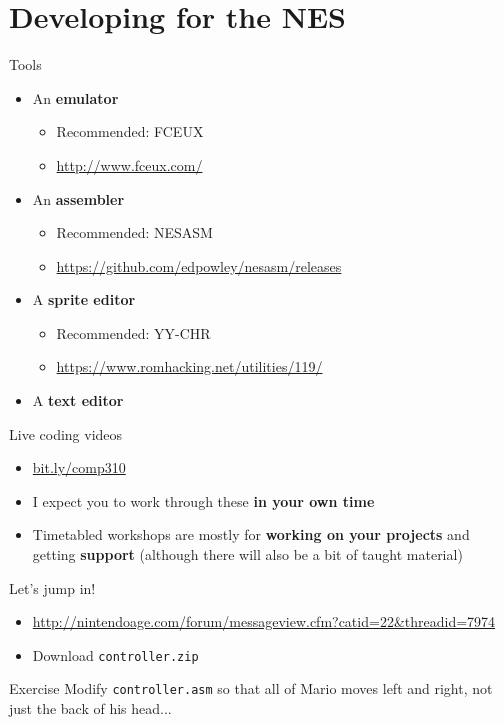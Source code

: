 \part{Developing for the NES}
\frame{\partpage}

\begin{frame}{Tools}
	\begin{itemize}
		\pause\item An \textbf{emulator}
			\begin{itemize}
				\pause\item Recommended: FCEUX
				\item \url{http://www.fceux.com/}
			\end{itemize}
		\pause\item An \textbf{assembler}
			\begin{itemize}
				\pause\item Recommended: NESASM
				\item {\footnotesize\url{https://github.com/edpowley/nesasm/releases}}
			\end{itemize}
		\pause\item A \textbf{sprite editor}
			\begin{itemize}
				\pause\item Recommended: YY-CHR
				\item \url{https://www.romhacking.net/utilities/119/}
			\end{itemize}
		\pause\item A \textbf{text editor}
	\end{itemize}
\end{frame}

\begin{frame}{Live coding videos}
	\begin{itemize}
		\pause\item \url{bit.ly/comp310}
		\pause\item I expect you to work through these \textbf{in your own time}
		\pause\item Timetabled workshops are mostly for \textbf{working on your projects} and getting \textbf{support}
		    (although there will also be a bit of taught material)
	\end{itemize}
\end{frame}

\begin{frame}{Let's jump in!}
	\begin{itemize}
		\pause\item \url{http://nintendoage.com/forum/messageview.cfm?catid=22&threadid=7974}
		\pause\item Download \texttt{controller.zip}
	\end{itemize}
\end{frame}

\begin{frame}{Exercise}
	Modify \texttt{controller.asm} so that all of Mario moves left and right, not just the back of his head...
\end{frame}

